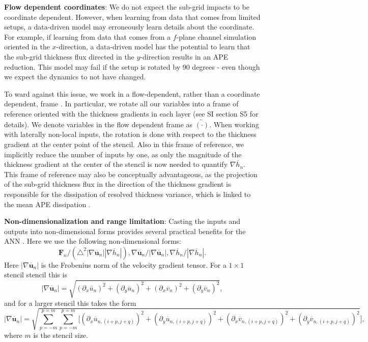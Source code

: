\documentclass[draft]{agujournal2019}
\begin{document}
\textbf{Flow dependent coordinates}:
We do not expect the sub-grid impacts to be coordinate dependent. However, when learning from data that comes from limited setups, a data-driven model may erroneously learn details about the coordinate. For example, if learning from data that comes from a $f$-plane channel simulation oriented in the $x$-direction, a data-driven model has the potential to learn that the sub-grid thickness flux directed in the $y$-direction results in an APE reduction. This model may fail if the setup is rotated by 90 degrees - even though we expect the dynamics to not have changed. 

To ward against this issue, we work in a flow-dependent, rather than a coordinate dependent, frame \cite{prakash2022invariant}. In particular, we rotate all our variables into a frame of reference oriented with the thickness gradients in each layer (see SI section S5 for details). We denote variables in the flow dependent frame as $\widetilde{(\cdot)}$.
When working with laterally non-local inputs, the rotation is done with respect to the thickness gradient at the center point of the stencil. 
Also in this frame of reference, we implicitly reduce the number of inputs by one, as only the magnitude of the thickness gradient at the center of the stencil is now needed to quantify $\nabla \overline{h}_n$. 
This frame of reference may also be conceptually advantageous, as the projection of the sub-grid thickness flux in the direction of the thickness gradient is responsible for the dissipation of resolved thickness variance, which is linked to the mean APE dissipation \cite{loose2023diagnosing}. 


\textbf{Non-dimensionalization and range limitation}:
Casting the inputs and outputs into non-dimensional forms provides several practical benefits for the ANN \cite{perezhogin2025generalizable}. Here we use the following non-dimensional forms: 
$$\mathbf{F}_n/({\triangle^2 |\nabla \overline{\mathbf{u}}_n| |\nabla \overline{h}_n|}), \nabla \overline{\mathbf{u}}_n/{|\nabla \overline{\mathbf{u}}_n|},  {\nabla \overline{h}_n}/{|\nabla \overline{h}_n|}.$$ 
Here $|\nabla \overline{\mathbf{u}}_n|$ is the Frobenius norm of the velocity gradient tensor. For a $1\times1$ stencil stencil this is
$$|\nabla \overline{\mathbf{u}}_n| = \sqrt{(\partial_x \overline{u}_n)^2 + (\partial_y \overline{u}_n)^2 + (\partial_x \overline{v}_n)^2 + (\partial_y \overline{v}_n)^2},$$ 
and for a larger stencil this takes the form 
$$|\nabla \overline{\mathbf{u}}_n| =\sqrt{\sum_{p=-m}^{p=m} \sum_{p=-m}^{p=m} [(\partial_x \overline{u}_{n, (i+p,j+q)})^{2} + (\partial_y \overline{u}_{n, (i+p,j+q)})^2 + (\partial_x \overline{v}_{n, (i+p,j+q)})^2 + (\partial_y \overline{v}_{n, (i+p,j+q)})^2}],$$ where $m$ is the stencil size. 
\end{document}
